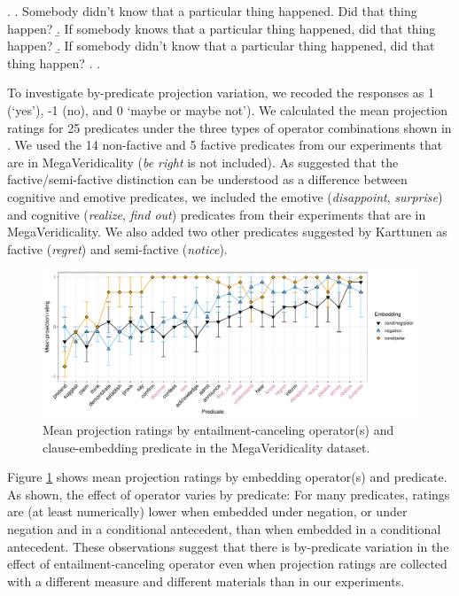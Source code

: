 \documentclass[a4paper,12pt,twoside]{article}
\begin{document}
			\ex. \a. Somebody didn’t know that a particular thing happened. Did that thing happen?
				\b.\label{mvb} If somebody knows that a particular thing happened, did that thing happen?
				\b.\label{mvc} If somebody didn’t know that a particular thing happened, did that thing happen?
				\z.
			\z.

    To investigate by-predicate projection variation, we recoded the responses as 1 (`yes'), -1 (no), and 0 `maybe or maybe not'). We calculated the mean projection ratings for 25 predicates under the three types of operator combinations shown in \Last. We used the 14 non-factive and 5 factive predicates from our experiments that are in MegaVeridicality (\textit{be right} is not included). As \citealt{djarv_cognitive_2018} suggested that the factive/semi-factive distinction can be understood as a difference between cognitive and emotive predicates, we included the emotive (\textit{disappoint}, \textit{surprise}) and cognitive (\textit{realize}, \textit{find out}) predicates from their experiments that are in MegaVeridicality. We also added two other predicates suggested by Karttunen as factive (\textit{regret}) and semi-factive (\textit{notice}).

           	\begin{figure}
				\centering
				\includegraphics[width = \linewidth]{megaveridicality}
				\caption{Mean projection ratings by entailment-canceling operator(s) and clause-embedding predicate in the MegaVeridicality dataset.}
				\label{fig:megaverid}
			\end{figure}

    Figure \ref{fig:megaverid} shows mean projection ratings by embedding operator(s) and predicate. As shown, the effect of operator varies by predicate: For many predicates, ratings are (at least numerically) lower when embedded under negation, or under negation and in a conditional antecedent, than when embedded in a conditional antecedent. These observations suggest that there is by-predicate variation in the effect of entailment-canceling operator even when projection ratings are collected with a different measure and different materials than in our experiments. 
\end{document}
